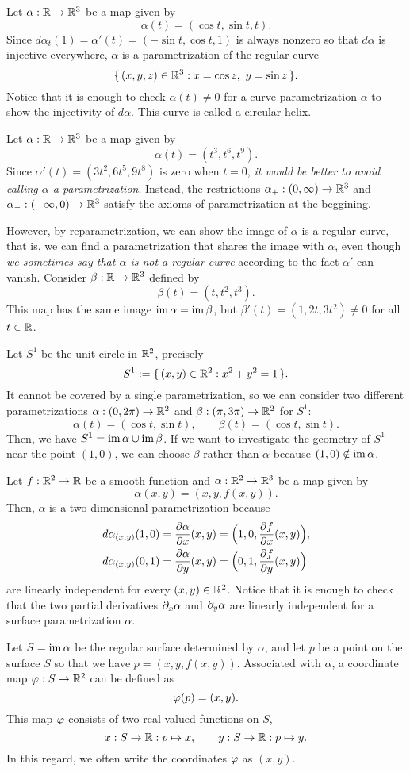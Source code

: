 \documentclass{../exp}
\def\a{\alpha}
\begin{document}
\begin{ex}
Let $\a:\R\to\R^3$ be a map given by
\[\a(t)=(\cos t,\sin t, t).\]
Since $d\a_t(1)=\a'(t)=(-\sin t,\cos t,1)$ is always nonzero so that $d\a$ is injective everywhere, $\a$ is a parametrization of the regular curve
\[\{\,(x,y,z)\in\mathbb{R}^3:x=\cos z,\ y=\sin z\,\}.\]
Notice that it is enough to check $\a(t)\ne0$ for a curve parametrization $\a$ to show the injectivity of $d\a$.
This curve is called a circular helix.
\end{ex}
\begin{ex}
Let $\a:\R\to\R^3$ be a map given by
\[\a(t)=(t^3,t^6,t^9).\]
Since $\a'(t)=(3t^2,6t^5,9t^8)$ is zero when $t=0$, \emph{it would be better to avoid calling $\a$ a parametrization}.
Instead, the restrictions $\a_+:(0,\infty)\to\R^3$ and $\a_-:(-\infty,0)\to\R^3$ satisfy the axioms of parametrization at the beggining.

However, by reparametrization, we can show the image of $\a$ is a regular curve, that is, we can find a parametrization that shares the image with $\a$, even though \emph{we sometimes say that $\a$ is not a regular curve} according to the fact $\a'$ can vanish.
Consider $\beta:\R\to\R^3$ defined by
\[\beta(t)=(t,t^2,t^3).\]
This map has the same image $\im\a=\im\beta$, but $\beta'(t)=(1,2t,3t^2)\ne0$ for all $t\in\mathbb{R}$.
\end{ex}
\begin{ex}
Let $S^1$ be the unit circle in $\mathbb{R}^2$, precisely
\[S^1:=\{\,(x,y)\in\mathbb{R}^2:x^2+y^2=1\,\}.\]
It cannot be covered by a single parametrization, so we can consider two different parametrizations $\a:(0,2\pi)\to\R^2$ and $\beta:(\pi,3\pi)\to\R^2$ for $S^1$:
\[\alpha(t)=(\cos t,\sin t),\qquad\beta(t)=(\cos t,\sin t).\]
Then, we have $S^1=\im\a\cup\im\beta$.
If we want to investigate the geometry of $S^1$ near the point $(1,0)$, we can choose $\beta$ rather than $\a$ because $(1,0)\notin\im\a$.
\end{ex}
\begin{ex}
Let $f:\R^2\to\R$ be a smooth function and $\a:\R^2\to\R^3$ be a map given by
\[\a(x,y)=(x,y,f(x,y)).\]
Then, $\a$ is a two-dimensional parametrization because
\begin{align*}
d\a_{(x,y)}(1,0)&=\pd{\a}{x}(x,y)=\Bigl(1,0,\pd{f}{x}(x,y)\Bigr),\\
d\a_{(x,y)}(0,1)&=\pd{\a}{y}(x,y)=\Bigl(0,1,\pd{f}{y}(x,y)\Bigr)
\end{align*}
are linearly independent for every $(x,y)\in\mathbb{R}^2$.
Notice that it is enough to check that the two partial derivatives $\pd_x\a$ and $\pd_y\a$ are linearly independent for a surface parametrization $\a$.

Let $S=\im\a$ be the regular surface determined by $\a$, and let $p$ be a point on the surface $S$ so that we have $p=(x,y,f(x,y))$.
Associated with $\a$, a coordinate map $\f:S\to\R^2$ can be defined as
\[\varphi(p)=(x,y).\]
This map $\varphi$ consists of two real-valued functions on $S$,
\[x:S\to\R:p\mapsto x,\qquad y:S\to\R:p\mapsto y.\]
In this regard, we often write the coordinates $\varphi$ as $(x,y)$.
\end{ex}
\end{document}
